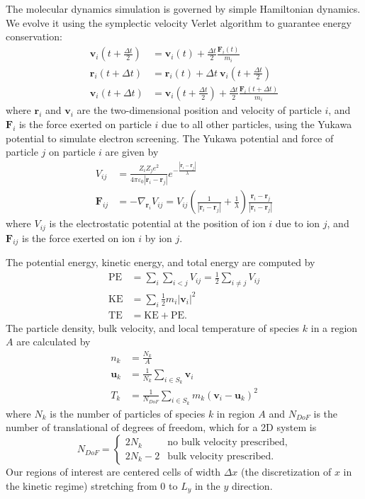 \documentclass{article}
\begin{document}
The molecular dynamics simulation is governed by simple Hamiltonian dynamics. We evolve it using the symplectic velocity Verlet algorithm to guarantee energy conservation:
\begin{align*}
\mathbf{v}_i\left(t+\frac{\Delta t}{2}\right)  	&= \mathbf{v}_i(t) + \frac{\Delta t}{2}\frac{\mathbf{F}_i(t)}{m_i} \\
\mathbf{r}_i(t+\Delta t) 		   		&= \mathbf{r}_i(t) + \Delta t\:\mathbf{v}_i\left(t+\frac{\Delta t}{2}\right) \\
\mathbf{v}_i(t+\Delta t)			  	&= \mathbf{v}_i\left(t+\frac{\Delta t}{2}\right) + 
								\frac{\Delta t}{2}\frac{\mathbf{F}_i(t+\Delta t)}{m_i}
\end{align*}
where $\mathbf{r}_i$ and $\mathbf{v}_i$ are the two-dimensional position and velocity of particle $i$, and $\mathbf{F}_i$ is the force exerted on particle $i$ due to all other particles, using the Yukawa potential to simulate electron screening. The Yukawa potential and force of particle $j$ on particle $i$ are given by
\begin{align*}
V_{ij}	&= \frac{Z_i Z_j e^2}{4 \pi \varepsilon_0 |\mathbf{r}_i - \mathbf{r}_j|}e^{-\frac{|\mathbf{r}_i - \mathbf{r}_j|}{\lambda}} \\
\mathbf{F}_{ij}	&= -\nabla_{\mathbf{r}_i}V_{ij} = V_{ij}\left(\frac{1}{|\mathbf{r}_i - \mathbf{r}_j|} + \frac{1}{\lambda}\right)\frac{\mathbf{r}_i - \mathbf{r}_j}{|\mathbf{r}_i - \mathbf{r}_j|}
\end{align*}
where $V_{ij}$ is the electrostatic potential at the position of ion $i$ due to ion $j$, and $\mathbf{F}_{ij}$ is the force exerted on ion $i$ by ion $j$.

The potential energy, kinetic energy, and total energy are computed by
\begin{align*}
\text{PE} &= \sum_i\sum_{i<j}V_{ij} = \frac{1}{2}\sum_{i\neq j}V_{ij} \\
\text{KE}	&= \sum_{i}\frac{1}{2}m_i|\mathbf{v}_i|^2 \\
\text{TE}		&= \text{KE} + \text{PE}.
\end{align*}
The particle density, bulk velocity, and local temperature of species $k$ in a region $A$ are calculated by
\begin{align*}
n_k &= \frac{N_k}{A} \\
\mathbf{u}_k &= \frac{1}{N_k}\sum_{i\in S_k}\mathbf{v}_i \\
T_k &= \frac{1}{N_{DoF}}\sum_{i\in S_k}m_k(\mathbf{v}_i-\mathbf{u}_k)^2
\end{align*}
where $N_k$ is the number of particles of species $k$ in region $A$ and $N_{DoF}$ is the number of translational of degrees of freedom, which for a 2D system is
\begin{equation*}
N_{DoF} = \begin{cases}
	2N_k& 	\text{no bulk velocity prescribed}, \\
	2N_k-2&	\text{bulk velocity prescribed.}
\end{cases}
\end{equation*}
Our regions of interest are centered cells of width $\Delta x$ (the discretization of $x$ in the kinetic regime) stretching from $0$ to $L_y$ in the $y$ direction.
\end{document}
